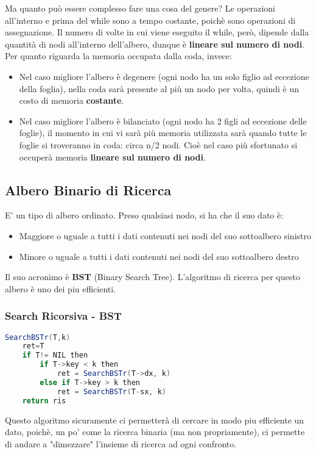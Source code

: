 Ma quanto può essere complesso fare una cosa del genere? Le operazioni all'interno e prima del while sono a tempo costante, poichè sono operazioni di assegnazione. Il numero di volte in cui viene eseguito il while, però, dipende dalla quantità di nodi all'interno dell'albero, dunque è \textbf{lineare sul numero di nodi}.
Per quanto riguarda la memoria occupata dalla coda, invece:
\begin{itemize}
	\item Nel caso migliore l'albero è degenere (ogni nodo ha un solo figlio ad eccezione della foglia), nella coda sarà presente al più un nodo per volta, quindi è un costo di memoria \textbf{costante}.
	\item Nel caso migliore l'albero è bilanciato (ogni nodo ha 2 figli ad eccezione delle foglie), il momento in cui vi sarà più memoria utilizzata sarà quando tutte le foglie si troveranno in coda: circa n/2 nodi. Cioè nel caso più sfortunato si occuperà memoria \textbf{lineare sul numero di nodi}.   
\end{itemize}

\subsection{Albero Binario di Ricerca}
E' un tipo di albero ordinato. Preso qualsiasi nodo, si ha che il suo dato è:
\begin{itemize}
	\item Maggiore o uguale a tutti i dati contenuti nei nodi del suo sottoalbero sinistro
	\item Minore o uguale a tutti i dati contenuti nei nodi del suo sottoalbero destro
\end{itemize} 
Il suo acronimo è \textbf{BST} (Binary Search Tree). L'algoritmo di ricerca per questo albero è uno dei piu efficienti.

\subsubsection{Search Ricorsiva - BST}

\begin{lstlisting}[language=Java]
	SearchBSTr(T,k)
	ret=T
	if T!= NIL then
		if T->key < k then
			ret = SearchBSTr(T->dx, k)
		else if T->key > k then
			ret = SearchBSTr(T-sx, k)
	return ris	
\end{lstlisting}

Questo algoritmo sicuramente ci permetterà di cercare in modo piu efficiente un dato, poichè, un po' come la ricerca binaria (ma non propriamente), ci permette di andare a "dimezzare" l'insieme di ricerca ad ogni confronto.\\

